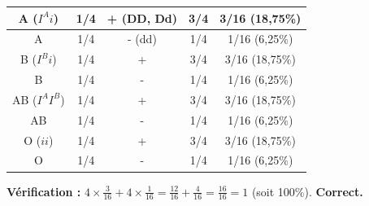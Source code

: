 \documentclass[11pt]{article}
\begin{document}
\begin{exoresolu}
\begin{enumerate}
\begin{center}
\begin{tabular}{|c|c|c|c|c|}
        A ($I^A i$) & 1/4 & + (DD, Dd) & 3/4 & 3/16 (18,75\%) \\ \hline
        A & 1/4 & - (dd) & 1/4 & 1/16 (6,25\%) \\ \hline
        B ($I^B i$) & 1/4 & + & 3/4 & 3/16 (18,75\%) \\ \hline
        B & 1/4 & - & 1/4 & 1/16 (6,25\%) \\ \hline
        AB ($I^A I^B$) & 1/4 & + & 3/4 & 3/16 (18,75\%) \\ \hline
        AB & 1/4 & - & 1/4 & 1/16 (6,25\%) \\ \hline
        O ($ii$) & 1/4 & + & 3/4 & 3/16 (18,75\%) \\ \hline
        O & 1/4 & - & 1/4 & 1/16 (6,25\%) \\ \hline
    \end{tabular}
    \end{center}
    \textbf{Vérification :} 
    $4 \times \frac{3}{16} + 4 \times \frac{1}{16} = \frac{12}{16} + \frac{4}{16} = \frac{16}{16} = 1$ (soit 100\%). \textbf{Correct.}
\end{enumerate}
\end{exoresolu}
\end{document}
